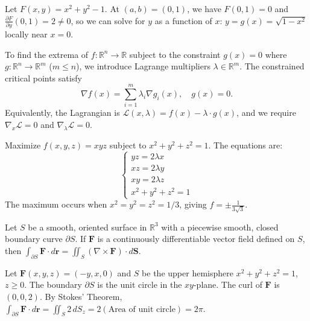 \begin{example}
Let $F(x,y) = x^2 + y^2 - 1$. At $(a,b) = (0,1)$, we have $F(0,1) = 0$ and $\frac{\partial F}{\partial y}(0,1) = 2 \neq 0$, so we can solve for $y$ as a function of $x$: $y = g(x) = \sqrt{1-x^2}$ locally near $x=0$.
\end{example}

\begin{definition}
To find the extrema of $f: \mathbb{R}^n \to \mathbb{R}$ subject to the constraint $g(x) = 0$ where $g: \mathbb{R}^n \to \mathbb{R}^m$ ($m \leq n$), we introduce Lagrange multipliers $\lambda \in \mathbb{R}^m$. The constrained critical points satisfy
\[
\nabla f(x) = \sum_{i=1}^m \lambda_i \nabla g_i(x), \quad g(x) = 0.
\]
Equivalently, the Lagrangian is $\mathcal{L}(x, \lambda) = f(x) - \lambda \cdot g(x)$, and we require $\nabla_x \mathcal{L} = 0$ and $\nabla_\lambda \mathcal{L} = 0$.
\end{definition}

\begin{example}
Maximize $f(x,y,z) = xyz$ subject to $x^2 + y^2 + z^2 = 1$. The equations are:
\[
\begin{cases}
yz = 2\lambda x \\
xz = 2\lambda y \\
xy = 2\lambda z \\
x^2 + y^2 + z^2 = 1
\end{cases}
\]
The maximum occurs when $x^2 = y^2 = z^2 = 1/3$, giving $f = \pm \frac{1}{3\sqrt{3}}$.
\end{example}

\begin{theorem}
Let $S$ be a smooth, oriented surface in $\mathbb{R}^3$ with a piecewise smooth, closed boundary curve $\partial S$. If $\mathbf{F}$ is a continuously differentiable vector field defined on $S$, then $\int_{\partial S} \mathbf{F} \cdot d\mathbf{r} = \iint_S (\nabla \times \mathbf{F}) \cdot d\mathbf{S}$.
\end{theorem}

\begin{example}
Let $\mathbf{F}(x,y,z) = (-y, x, 0)$ and $S$ be the upper hemisphere $x^2+y^2+z^2=1$, $z \geq 0$. The boundary $\partial S$ is the unit circle in the $xy$-plane. The curl of $\mathbf{F}$ is $(0, 0, 2)$. By Stokes' Theorem, $\int_{\partial S} \mathbf{F} \cdot d\mathbf{r} = \iint_S 2 \, dS_z = 2(\text{Area of unit circle}) = 2\pi$.
\end{example}

